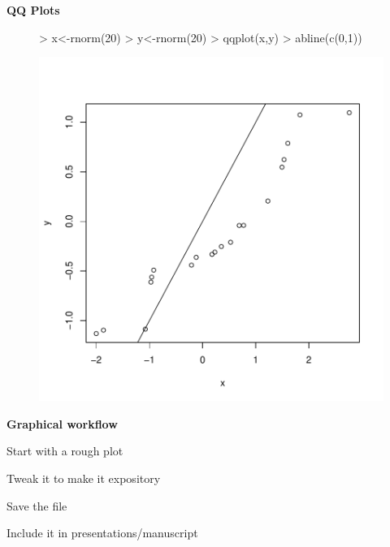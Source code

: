 \documentclass[xcolor=dvipsnames , 11pt]{beamer}
\begin{document}
\begin{frame}[fragile]{\textbf{QQ Plots}}

\begin{center}
\begin{figure}
\centering
\begin{Schunk}
\begin{Sinput}
> x<-rnorm(20)
> y<-rnorm(20)
> qqplot(x,y)
> abline(c(0,1))
\end{Sinput}
\end{Schunk}
\includegraphics{lesson_graphs_presentation-008}
\end{figure}
\end{center}

\end{frame}

\begin{frame}{\textbf{Graphical workflow}}

\begin{itemize}
\begin{pause}
\item{Start with a rough plot}
\end{pause}
\begin{pause}
\item{Tweak it to make it expository}
\end{pause}
\begin{pause}
\item{Save the file}
\end{pause}
\begin{pause}
\item{Include it in presentations/manuscript}
\end{pause}
\end{itemize}
\end{frame}
\end{document}
